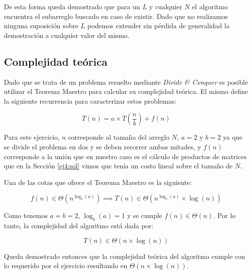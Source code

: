 De esta forma queda demostrado que para un $L$ y cualquier $N$ el algoritmo
encuentra el subarreglo buscado en caso de existir. Dado que no realizamos
ninguna suposición sobre $L$ podemos extender sin pérdida de generalidad la
demostración a cualquier valor del mismo.

\subsection{Complejidad teórica}

Dado que se trata de un problema resuelto mediante \emph{Divide \& Conquer} es
posible utilizar el Teorema Maestro para calcular su complejidad teórica. El
mismo define la siguiente recurrencia para caracterizar estos problemas:

\begin{equation*}
	T\left(n\right) = a \times T\left(\frac{n}{b}\right) + f\left(n\right)
\end{equation*}

Para este ejercicio, $n$ corresponde al tamaño del arreglo $N$, $a = 2$ y $b = 2$ ya que se divide el problema en dos y se
deben recorrer ambas mitades, y $f\left(n\right)$ corresponde a la unión que en
nuestro caso es el cálculo de productos de matrices que en la Sección
\ref{ej4:sol} vimos que tenía un costo lineal sobre el tamaño de $N$.

Una de las cotas que ofrece el Teorema Maestro es la siguiente:

\begin{equation*}
	f\left(n\right) \in \Theta\left(n^{\log_b\left(a\right)}\right)
	\implies T\left(n\right) \in \Theta\left(n^{\log_b\left(a\right)} \times
	\log\left(n\right)\right)
\end{equation*}

Como tenemos $a = b = 2$, $\log_b\left(a\right) = 1$ y se cumple
$f\left(n\right) \in \Theta\left(n\right)$. Por lo tanto, la complejidad del
algoritmo está dada por:

\begin{equation*}
	T\left(n\right) \in \Theta\left(n \times \log\left(n\right)\right)
\end{equation*}

Queda demostrado entonces que la complejidad teórica del algoritmo cumple con lo
requerido por el ejercicio resultando en $\Theta\left(n \times
\log\left(n\right)\right)$.

